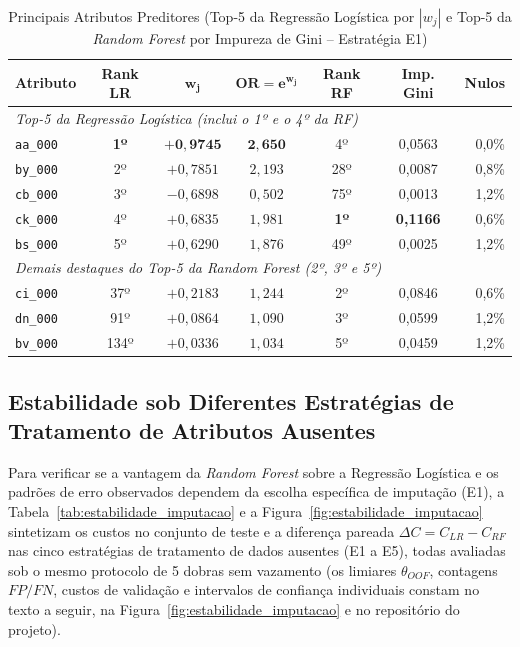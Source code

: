 \documentclass[conference]{IEEEtran}
\begin{document}
\begin{table}[htbp]
\caption{Principais Atributos Preditores (Top-5 da Regressão Logística por $|w_j|$ e Top-5 da \textit{Random Forest} por Impureza de Gini -- Estratégia E1)}
\label{tab:interpretabilidade_atributos}
\centering
\footnotesize
\setlength{\tabcolsep}{3.5pt}
\begin{tabular}{lcccccr}
\toprule
\textbf{Atributo} & \textbf{Rank LR} & $\mathbf{w_j}$ & $\mathbf{OR = e^{w_j}}$ & \textbf{Rank RF} & \textbf{Imp. Gini} & \textbf{Nulos} \\
\midrule
\multicolumn{7}{l}{\textit{Top-5 da Regressão Logística (inclui o 1º e o 4º da RF)}} \\
\texttt{aa\_000} & \textbf{1º} & $\mathbf{+0{,}9745}$ & $\mathbf{2{,}650}$ & 4º & 0,0563 & 0,0\% \\
\texttt{by\_000} & 2º & $+0{,}7851$ & $2{,}193$ & 28º & 0,0087 & 0,8\% \\
\texttt{cb\_000} & 3º & $-0{,}6898$ & $0{,}502$ & 75º & 0,0013 & 1,2\% \\
\texttt{ck\_000} & 4º & $+0{,}6835$ & $1{,}981$ & \textbf{1º} & \textbf{0,1166} & 0,6\% \\
\texttt{bs\_000} & 5º & $+0{,}6290$ & $1{,}876$ & 49º & 0,0025 & 1,2\% \\
\midrule
\multicolumn{7}{l}{\textit{Demais destaques do Top-5 da Random Forest (2º, 3º e 5º)}} \\
\texttt{ci\_000} & 37º & $+0{,}2183$ & $1{,}244$ & 2º & 0,0846 & 0,6\% \\
\texttt{dn\_000} & 91º & $+0{,}0864$ & $1{,}090$ & 3º & 0,0599 & 1,2\% \\
\texttt{bv\_000} & 134º & $+0{,}0336$ & $1{,}034$ & 5º & 0,0459 & 1,2\% \\
\bottomrule
\end{tabular}
\end{table}

\subsection{Estabilidade sob Diferentes Estratégias de Tratamento de Atributos Ausentes}

Para verificar se a vantagem da \textit{Random Forest} sobre a Regressão Logística e os padrões de erro observados dependem da escolha específica de imputação (E1), a Tabela~\ref{tab:estabilidade_imputacao} e a Figura~\ref{fig:estabilidade_imputacao} sintetizam os custos no conjunto de teste e a diferença pareada $\Delta C = C_{LR} - C_{RF}$ nas cinco estratégias de tratamento de dados ausentes (E1 a E5), todas avaliadas sob o mesmo protocolo de 5 dobras sem vazamento (os limiares $\theta_{OOF}$, contagens $FP/FN$, custos de validação e intervalos de confiança individuais constam no texto a seguir, na Figura~\ref{fig:estabilidade_imputacao} e no repositório do projeto).
\end{document}

